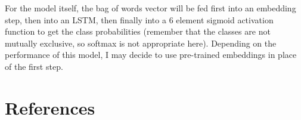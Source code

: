 \documentclass[12pt]{article}
\begin{document}
For the model itself, the bag of words vector will be fed first into an embedding step, then into an LSTM, then finally into a 6 element sigmoid activation function to get the class probabilities (remember that the classes are not mutually exclusive, so softmax is not appropriate here). Depending on the performance of this model, I may decide to use pre-trained embeddings in place of the first step.
\section*{References}
\label{sec:org0296528}
\printbibliography[heading=none]
\end{document}
